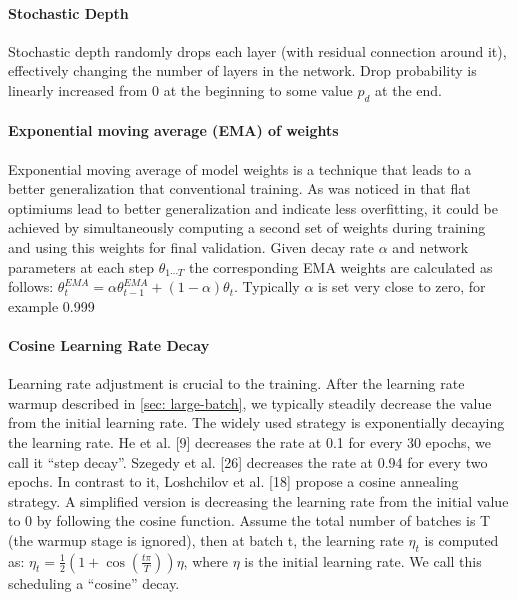 \paragraph{Stochastic Depth}

Stochastic depth \cite{huang2016_stochastic_depth} randomly drops each layer (with residual connection around it), effectively changing the number of layers in the network. Drop probability is linearly increased from $0$ at the beginning to some value $p_d$ at the end.

\paragraph{Exponential moving average (EMA) of weights}

Exponential moving average of model weights \cite{izmailov2018_averaging_swa_ema} is a technique that leads to a better generalization that conventional training. As was noticed in \cite{garipov2018_loss_surfaces} that flat optimiums lead to better generalization and indicate less overfitting, it could be achieved by simultaneously computing a second set of weights during training and using this weights for final validation. Given decay rate $\alpha$ and network parameters at each step $\theta_{1 \cdots T}$ the corresponding EMA weights are calculated as follows: $\theta_{t}^{EMA} = \alpha \theta_{t-1}^{EMA} + (1 - \alpha) \theta_{t} $. Typically $\alpha$ is set very close to zero, for example 0.999 \cite{tan2021_efficientnetv2} 

\paragraph{Cosine Learning Rate Decay}

Learning rate adjustment is crucial to the training. After the learning rate warmup described in \autoref{sec: large-batch}, we typically steadily decrease the value from the initial learning rate. The widely used strategy is exponentially decaying the learning rate. He et al. [9] decreases the rate at 0.1 for every 30 epochs, we call it “step decay”. Szegedy et al. [26] decreases the rate at 0.94 for every two epochs.
In contrast to it, Loshchilov et al. [18] propose a cosine annealing strategy. A simplified version is decreasing the learning rate from the initial value to 0 by following the cosine function. Assume the total number of batches is T (the warmup stage is ignored), then at batch t, the learning rate $η_t$ is computed as:
$\eta_{t}=\frac{1}{2}\left(1+\cos \left(\frac{t \pi}{T}\right)\right) \eta$, where $\eta$ is the initial learning rate. We call this scheduling a “cosine” decay.

